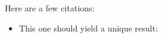\documentclass{article}
\begin{document}
Here are a few citations:
\begin{itemize}
    \item
        This one should yield a unique result: \cite{stein:iwasawa}
\end{itemize}
    

\end{document}

